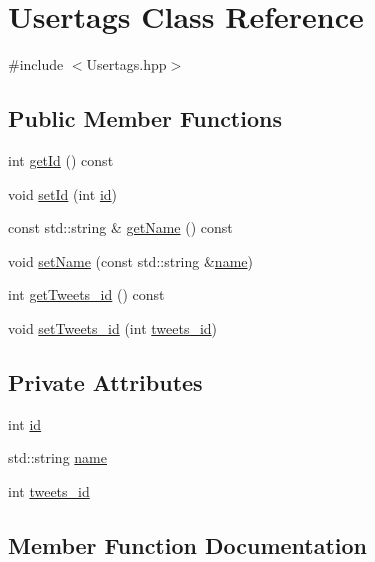 \hypertarget{class_usertags}{}\section{Usertags Class Reference}
\label{class_usertags}


{\ttfamily \#include $<$Usertags.\+hpp$>$}

\subsection*{Public Member Functions}
\begin{DoxyCompactItemize}
\item 
int \hyperlink{class_usertags_aa88b172ba497671d6920e93dd5f714d8}{get\+Id} () const
\item 
void \hyperlink{class_usertags_a3caae3ff620d10eb26dcb1340ca312ab}{set\+Id} (int \hyperlink{class_usertags_a43fb607a09c563f50ee0c865495956be}{id})
\item 
const std\+::string \& \hyperlink{class_usertags_a87d86d442421ff1b440332dd33f9f6d4}{get\+Name} () const
\item 
void \hyperlink{class_usertags_a62bfb926a0387927385fa1d7baef2af3}{set\+Name} (const std\+::string \&\hyperlink{class_usertags_a0da849a609d0f1dad6227b9feffbcb26}{name})
\item 
int \hyperlink{class_usertags_aa7b76271599fa091c6e8439c12331b48}{get\+Tweets\+\_\+id} () const
\item 
void \hyperlink{class_usertags_a42dd4860c07f793d877a485fae2b0e20}{set\+Tweets\+\_\+id} (int \hyperlink{class_usertags_a1f3caf61ffeebbd39c59b0a8bf0a378b}{tweets\+\_\+id})
\end{DoxyCompactItemize}
\subsection*{Private Attributes}
\begin{DoxyCompactItemize}
\item 
int \hyperlink{class_usertags_a43fb607a09c563f50ee0c865495956be}{id}
\item 
std\+::string \hyperlink{class_usertags_a0da849a609d0f1dad6227b9feffbcb26}{name}
\item 
int \hyperlink{class_usertags_a1f3caf61ffeebbd39c59b0a8bf0a378b}{tweets\+\_\+id}
\end{DoxyCompactItemize}


\subsection{Member Function Documentation}
\mbox{\label{class_usertags_aa88b172ba497671d6920e93dd5f714d8}} 
